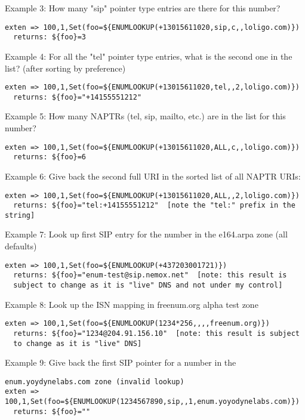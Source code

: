 Example 3: How many "sip" pointer type entries are there for this number?
\begin{verbatim}
exten => 100,1,Set(foo=${ENUMLOOKUP(+13015611020,sip,c,,loligo.com)})
  returns: ${foo}=3
\end{verbatim}

Example 4: For all the "tel" pointer type entries, what is the second
one in the list? (after sorting by preference)
\begin{verbatim}
exten => 100,1,Set(foo=${ENUMLOOKUP(+13015611020,tel,,2,loligo.com)})
  returns: ${foo}="+14155551212"
\end{verbatim}

Example 5: How many NAPTRs (tel, sip, mailto, etc.) are in the list for this number?
\begin{verbatim}
exten => 100,1,Set(foo=${ENUMLOOKUP(+13015611020,ALL,c,,loligo.com)})
  returns: ${foo}=6
\end{verbatim}

Example 6: Give back the second full URI in the sorted list of all NAPTR URIs:
\begin{verbatim}
exten => 100,1,Set(foo=${ENUMLOOKUP(+13015611020,ALL,,2,loligo.com)})
  returns: ${foo}="tel:+14155551212"  [note the "tel:" prefix in the string]
\end{verbatim}

Example 7: Look up first SIP entry for the number in the e164.arpa zone (all defaults)
\begin{verbatim}
exten => 100,1,Set(foo=${ENUMLOOKUP(+437203001721)})
  returns: ${foo}="enum-test@sip.nemox.net"  [note: this result is
  subject to change as it is "live" DNS and not under my control]
\end{verbatim}

Example 8: Look up the ISN mapping in freenum.org alpha test zone
\begin{verbatim}
exten => 100,1,Set(foo=${ENUMLOOKUP(1234*256,,,,freenum.org)})
  returns: ${foo}="1234@204.91.156.10"  [note: this result is subject
  to change as it is "live" DNS]
\end{verbatim}

Example 9: Give back the first SIP pointer for a number in the
\begin{verbatim}
enum.yoydynelabs.com zone (invalid lookup)
exten => 100,1,Set(foo=${ENUMLOOKUP(1234567890,sip,,1,enum.yoyodynelabs.com)})
  returns: ${foo}=""
\end{verbatim}

